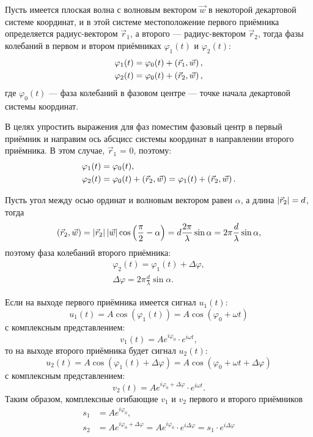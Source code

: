 Пусть имеется плоская волна с волновым вектором $\vec{w}$ в некоторой декартовой системе координат, и в этой системе местоположение первого приёмника определяется
радиус-вектором $\vec{r}_1$, а второго --- радиус-вектором $\vec{r}_2$, тогда фазы колебаний в первом и втором приёмниках $\varphi_1(t)$ и $\varphi_2(t)$:
\begin{align*}
    \varphi_1(t) & = \varphi_0(t) + \left ( \vec{r}_1, \vec{w} \right ) , \\
    \varphi_2(t) & = \varphi_0(t) + \left ( \vec{r}_2, \vec{w} \right ) ,
\end{align*}
где $\varphi_0(t)$ --- фаза колебаний в фазовом центре --- точке начала декартовой системы координат.

В целях упростить выражения для фаз поместим фазовый центр в первый приёмник и направим ось абсцисс системы координат в направлении второго приёмника. В этом случае,
$\vec{r}_1$ = 0, поэтому:
\begin{align*}
    \varphi_1(t) & = \varphi_0(t) , \\
    \varphi_2(t) & = \varphi_0(t) + \left ( \vec{r}_2, \vec{w} \right ) = \varphi_1(t) + \left ( \vec{r}_2, \vec{w} \right ) .
\end{align*}

Пусть угол между осью ординат и волновым вектором равен $\alpha$, а длина $\left | \vec{r}_2 \right | = d$, тогда
\begin{gather*}
    \left ( \vec{r}_2, \vec{w} \right )
    = \left | \vec{r}_2 \right | \left | \vec{w} \right | \cos \left ( \frac{\pi}{2} - \alpha \right )
    = d \frac{2 \pi}{\lambda} \sin \alpha
    = 2 \pi \frac{d}{\lambda} \sin \alpha ,
\end{gather*}
поэтому фаза колебаний второго приёмника:
\begin{gather*}
    \varphi_2(t) = \varphi_1(t) + \Delta \varphi , \\
    \Delta \varphi = 2 \pi \frac{d}{\lambda} \sin \alpha .
\end{gather*}

Если на выходе первого приёмника имеется сигнал $u_1(t)$:
\[
    u_1(t)
    = A \cos \left ( \varphi_1(t) \right )
    = A \cos \left ( \varphi_0 + \omega t \right )
\]
с комплексным представлением:
\[
    v_1(t)
    = A e^{i \varphi_0} \cdot e^{i \omega t} ,
\]
то на выходе второго приёмника будет сигнал $u_2(t)$:
\[
    u_2(t)
    = A \cos \left ( \varphi_1(t) + \Delta \varphi \right )
    = A \cos \left ( \varphi_0 + \omega t + \Delta \varphi \right )
\]
с комплексным представлением:
\[
    v_2(t)
    = A e^{i \varphi_0 + \Delta \varphi } \cdot e^{i \omega t} .
\]
Таким образом, комплексные огибающие $v_1$ и $v_2$ первого и второго приёмников
\begin{align*}
    s_1 & = A e^{i \varphi_0} , \\
    s_2 & = A e^{i \varphi_0 + \Delta \varphi} = A e^{i \varphi_0} \cdot e^{i \Delta \varphi} = s_1 \cdot e^{i \Delta \varphi}
\end{align*}

